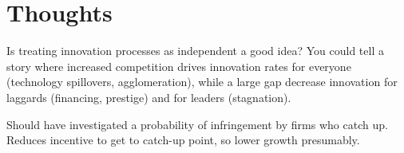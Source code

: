 \documentclass[11pt]{article}
\begin{document}
\section{Thoughts}
\label{sec:thought}

  Is treating innovation processes as independent a good idea?  You could tell a story where increased competition drives innovation rates for everyone (technology spillovers, agglomeration), while a large gap decrease innovation for laggards (financing, prestige) and for leaders (stagnation).

  Should have investigated a probability of infringement by firms who catch up.  Reduces incentive to get to catch-up point, so lower growth presumably.
\end{document}
